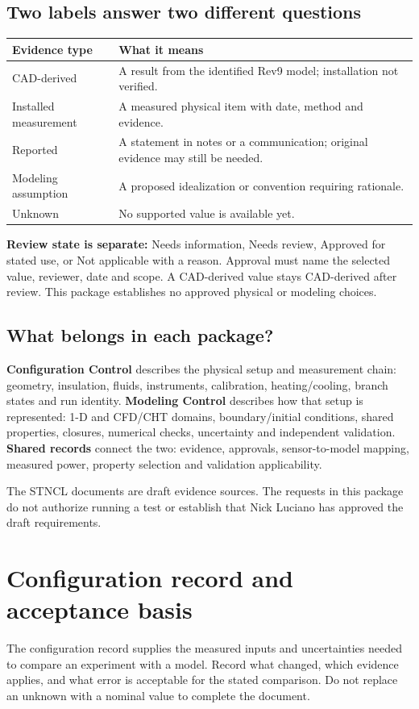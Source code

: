 \documentclass[11pt]{article}
\newcommand{\notebox}[1]{\par\noindent\colorbox{pale}{\parbox{\dimexpr\linewidth-2\fboxsep\relax}{#1}}\par}
\begin{document}
\subsection*{Two labels answer two different questions}
\small\setlength{\tabcolsep}{4pt}
\begin{longtable}{>{\raggedright\arraybackslash}p{}>{\raggedright\arraybackslash}p{}}
\toprule
\textbf{Evidence type} & \textbf{What it means} \\\midrule\endhead
CAD-derived & A result from the identified Rev9 model; installation not verified. \\[3pt]
Installed measurement & A measured physical item with date, method and evidence. \\[3pt]
Reported & A statement in notes or a communication; original evidence may still be needed. \\[3pt]
Modeling assumption & A proposed idealization or convention requiring rationale. \\[3pt]
Unknown & No supported value is available yet. \\[3pt]
\bottomrule\end{longtable}\normalsize
\textbf{Review state is separate:} Needs information, Needs review, Approved for stated use, or Not applicable with a reason. Approval must name the selected value, reviewer, date and scope. A CAD-derived value stays CAD-derived after review. This package establishes no approved physical or modeling choices.
\subsection*{What belongs in each package?}
\textbf{Configuration Control} describes the physical setup and measurement chain: geometry, insulation, fluids, instruments, calibration, heating/cooling, branch states and run identity.
\textbf{Modeling Control} describes how that setup is represented: 1-D and CFD/CHT domains, boundary/initial conditions, shared properties, closures, numerical checks, uncertainty and independent validation.
\textbf{Shared records} connect the two: evidence, approvals, sensor-to-model mapping, measured power, property selection and validation applicability.
\notebox{The STNCL documents are draft evidence sources. The requests in this package do not authorize running a test or establish that Nick Luciano has approved the draft requirements.}
\par
\clearpage\section{Configuration record and acceptance basis}\label{configuration-record}
\begingroup\small
The configuration record supplies the measured inputs and uncertainties needed to compare an experiment with a model. Record what changed, which evidence applies, and what error is acceptable for the stated comparison. Do not replace an unknown with a nominal value to complete the document.
\end{document}
